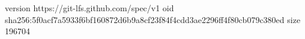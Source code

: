 version https://git-lfs.github.com/spec/v1
oid sha256:5f0acf7a5933f6bf160872d6b9a8cf23f84f4cdd3ae2296ff4f80cb079c380ed
size 196704
